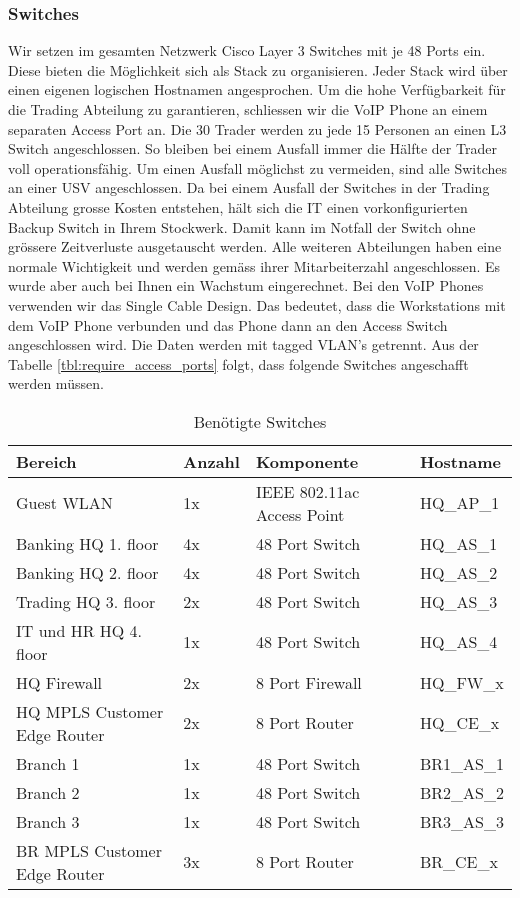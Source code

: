 \subsubsection{Switches}
Wir setzen im gesamten Netzwerk Cisco Layer 3 Switches mit je 48 Ports ein. Diese bieten die Möglichkeit sich als Stack zu organisieren. Jeder Stack wird über einen eigenen logischen Hostnamen angesprochen. Um die hohe Verfügbarkeit für die Trading Abteilung zu garantieren, schliessen wir die VoIP Phone an einem separaten Access Port an. Die 30 Trader werden zu jede 15 Personen an einen L3 Switch angeschlossen. So bleiben bei einem Ausfall immer die Hälfte der Trader voll operationsfähig. Um einen Ausfall möglichst zu vermeiden, sind alle Switches an einer USV angeschlossen. Da bei einem Ausfall der Switches in der Trading Abteilung grosse Kosten entstehen, hält sich die IT einen vorkonfigurierten Backup Switch in Ihrem Stockwerk. Damit kann im Notfall der Switch ohne grössere Zeitverluste ausgetauscht werden. Alle weiteren Abteilungen haben eine normale Wichtigkeit und werden gemäss ihrer Mitarbeiterzahl angeschlossen. Es wurde aber auch bei Ihnen ein Wachstum eingerechnet. Bei den VoIP Phones verwenden wir das Single Cable Design. Das bedeutet, dass die Workstations mit dem VoIP Phone verbunden und das Phone dann an den Access Switch angeschlossen wird. Die Daten werden mit tagged VLAN's getrennt. Aus der Tabelle \ref{tbl:require_access_ports} folgt, dass folgende Switches angeschafft werden müssen. 
\begin{table}[h]
	\centering
	\begin{tabu} to \linewidth {l l l X }
		\toprule 
		Bereich & Anzahl & Komponente & Hostname \\
		\midrule
		Guest WLAN & 1x & IEEE 802.11ac Access Point & HQ\_AP\_1 \\
		Banking HQ 1. floor & 4x & 48 Port Switch & HQ\_AS\_1 \\
		Banking HQ 2. floor & 4x & 48 Port Switch & HQ\_AS\_2 \\
		Trading HQ 3. floor & 2x & 48 Port Switch & HQ\_AS\_3 \\
		IT und HR HQ 4. floor & 1x & 48 Port Switch & HQ\_AS\_4 \\
		\midrule
		HQ Firewall & 2x & 8 Port Firewall & HQ\_FW\_x \\
		HQ MPLS Customer Edge Router & 2x & 8 Port Router & HQ\_CE\_x \\
		\midrule
		Branch 1 & 1x & 48 Port Switch & BR1\_AS\_1 \\
		Branch 2 & 1x & 48 Port Switch & BR2\_AS\_2 \\
		Branch 3 & 1x & 48 Port Switch & BR3\_AS\_3 \\
		BR MPLS Customer Edge Router & 3x & 8 Port Router & BR\_CE\_x \\
		\bottomrule 
	\end{tabu} 
	\caption{Benötigte Switches}
\end{table}

